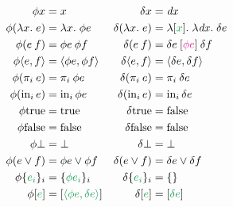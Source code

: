 \documentclass{rntz}\usepackage[a5]{rntzgeometry}\usepackage[fullwidth=130mm,width=330pt,]{narrow}
\newcommand\mathvar[1]{\ensuremath{#1}} %
\renewcommand\mathvar[1]{\ensuremath{\mathit{#1}}} %
\newcommand\isocolor{\color{ForestGreen}} %
\newcommand\fn\lambda
\newcommand\injc{\text{in}}
\newcommand\inj[1]{\injc_{#1}\,}
\newcommand\<{\mskip 4mu plus 4mu minus 1mu}
\newcommand\dx{\mathvar{dx}}
\newcommand\fnspace{\;}
\newcommand\fnof[1]{\fn{#1}.\fnspace}
\newcommand\kwname\textbf
\newcommand\eset[1]{\{{#1}\}}
\newcommand\etrue{\mathrm{true}}
\newcommand\efalse{\mathrm{false}}
\newcommand\ebox[1]{[{#1}]}
\newcommand\eboxd[1]{\ebox{\isocolor #1}}
\newcommand\esetd[1]{\eset{\isocolor #1}}
\newcommand\etuple[1]{\langle{#1}\rangle}
\newcommand\splitsum{\kwname{split}\<}
\begin{document}
\begin{figure*}
  \begin{align*}
    \phi x &= x & \delta x &= \dx\\
    \phi(\fnof x e) &= \fnof x \phi e
    & \delta(\fnof{x} e) &= \fnof{\eboxd x} \fnof\dx \delta e\\
    \phi(e\<f) &= \phi e\<\phi f
    & \delta(e\<f) &= \delta e \<\eboxd{\color{Rhodamine}\phi e} \<\delta f\\
    \phi\etuple{e,f} &= \etuple{\phi e, \phi f}
    & \delta\etuple{e,f} &= \etuple{\delta e, \delta f}\\
    \phi(\pi_i\<e) &= \pi_i\<\phi e
    & \delta(\pi_i\<e) &= \pi_i\<\delta e\\
    \phi(\inj i e) &= \inj i \phi e
    & \delta(\inj i e) &= \inj i \delta e\\
    \phi\etrue &= \etrue & \delta\etrue &= \efalse\\
    \phi\efalse &= \efalse & \delta\efalse &= \efalse\\
    \phi\bot &= \bot & \delta\bot &= \bot\\
    \phi(e \vee f) &= \phi e \vee \phi f
    & \delta(e \vee f) &= \delta e \vee \delta f\\
    \phi\esetd{e_i}_i &= \esetd{\phi e_i}_i & \delta\esetd{e_i}_i &= \esetd{}\\
    \phi\eboxd{e} &= \eboxd{\etuple{\phi e, \delta e}}
    & \delta\eboxd{e} &= \eboxd{\delta e}
  \end{align*}




\end{figure*}
\end{document}
